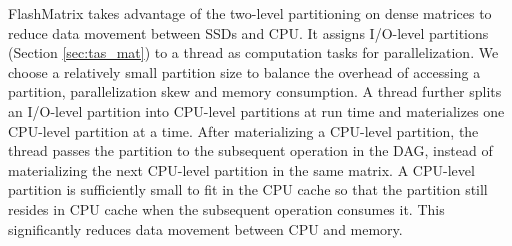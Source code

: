 
FlashMatrix takes advantage of the two-level
partitioning on dense matrices to reduce data movement between SSDs and CPU.
It assigns I/O-level partitions (Section \ref{sec:tas_mat}) to a thread as
computation tasks for parallelization. We choose a relatively small partition
size to balance the overhead of accessing a partition, parallelization skew
and memory consumption. A thread further splits an I/O-level partition into
CPU-level partitions at run time and materializes one CPU-level partition at
a time. After materializing a CPU-level partition, the thread passes the partition
to the subsequent operation in the DAG, instead of materializing the next CPU-level
partition in the same matrix. A CPU-level partition is sufficiently small
to fit in the CPU cache so that the partition still resides in CPU cache when
the subsequent operation consumes it. This significantly reduces data movement
between CPU and memory.



